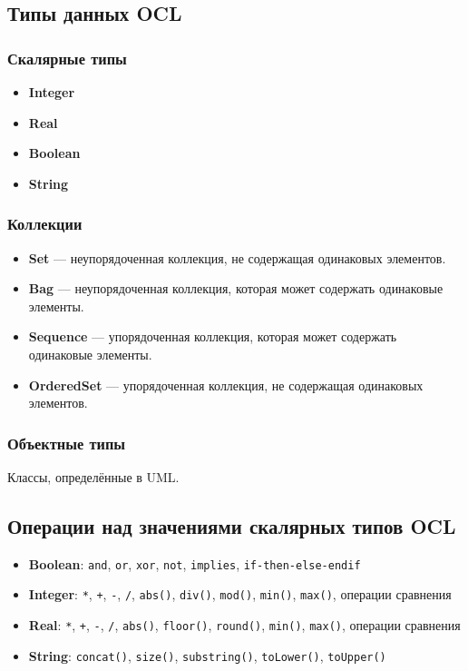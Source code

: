 \documentclass[a4paper,12pt]{article}
\begin{document}
\subsection{Типы данных OCL}

\subsubsection{Скалярные типы}
\begin{itemize}
    \item \textbf{Integer}
    \item \textbf{Real}
    \item \textbf{Boolean}
    \item \textbf{String}
\end{itemize}

\subsubsection{Коллекции}
\begin{itemize}
    \item \textbf{Set} — неупорядоченная коллекция, не содержащая одинаковых элементов.
    \item \textbf{Bag} — неупорядоченная коллекция, которая может содержать одинаковые элементы.
    \item \textbf{Sequence} — упорядоченная коллекция, которая может содержать одинаковые элементы.
    \item \textbf{OrderedSet} — упорядоченная коллекция, не содержащая одинаковых элементов.
\end{itemize}

\subsubsection{Объектные типы}
Классы, определённые в UML.

\subsection{Операции над значениями скалярных типов OCL}

\begin{itemize}
    \item \textbf{Boolean}: \texttt{and}, \texttt{or}, \texttt{xor}, \texttt{not}, \texttt{implies}, \texttt{if-then-else-endif}
    \item \textbf{Integer}: \texttt{*}, \texttt{+}, \texttt{-}, \texttt{/}, \texttt{abs()}, \texttt{div()}, \texttt{mod()}, \texttt{min()}, \texttt{max()}, операции сравнения
    \item \textbf{Real}: \texttt{*}, \texttt{+}, \texttt{-}, \texttt{/}, \texttt{abs()}, \texttt{floor()}, \texttt{round()}, \texttt{min()}, \texttt{max()}, операции сравнения
    \item \textbf{String}: \texttt{concat()}, \texttt{size()}, \texttt{substring()}, \texttt{toLower()}, \texttt{toUpper()}
\end{itemize}
\end{document}
